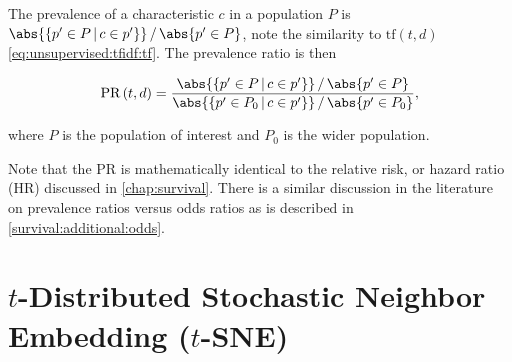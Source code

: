 The prevalence of a characteristic $c$ in a population $P$ is $\abs{\{p' \in P \, | \, c \in p'\}} \, / \, \abs{p' \in P}$,
note the similarity to $\text{tf}\left(t,d\right)$ \cref{eq:unsupervised:tfidf:tf}.
The prevalence ratio is then

\begin{equation}\label{eq:unsupervised:PR}
\text{PR}\left(t,d\right) = \frac{ \abs{\{p' \in P \, | \, c \in p'\}} \, / \, \abs{p' \in P} }{ \abs{\{p' \in P_{0} \, | \, c \in p'\}} \, / \, \abs{p' \in P_{0}} },
\end{equation}

\noindent where $P$ is the population of interest and $P_{0}$ is the wider population.

Note that the PR is mathematically identical to the relative risk, or hazard ratio (HR) discussed in \cref{chap:survival}.
There is a similar discussion in the literature \cite{pmid27460748,10.3389/fvets.2017.00193}
on prevalence ratios versus odds ratios as is described in \cref{survival:additional:odds}.


\section{\texorpdfstring{$t$}{t}-Distributed Stochastic Neighbor Embedding (\texorpdfstring{$t$}{t}-SNE)}
\label{dim_reduct:tSNE}
